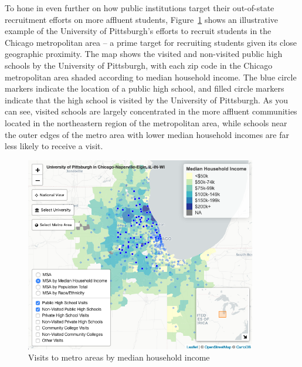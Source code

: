 \documentclass{article}
\begin{document}
To hone in even further on how public institutions target their out-of-state recruitment efforts on more affluent students, Figure~\ref{fig:income_map} shows an illustrative example of the University of Pittsburgh's efforts to recruit students in the Chicago metropolitan area -- a prime target for recruiting students given its close geographic proximity. The map shows the visited and non-visited public high schools by the University of Pittsburgh, with each zip code in the Chicago metropolitan area shaded according to median household income. The blue circle markers indicate the location of a public high school, and filled circle markers indicate that the high school is visited by the University of Pittsburgh. As you can see, visited schools are largely concentrated in the more affluent communities located in the northeastern region of the metropolitan area, while schools near the outer edges of the metro area with lower median household incomes are far less likely to receive a visit.


\begin{figure}[!tp]
    \centering
    \includegraphics[width=0.9\textwidth]{assets/maps/income_map.png}
    \caption{Visits to metro areas by median household income}
    \label{fig:income_map}
\end{figure}
\end{document}
